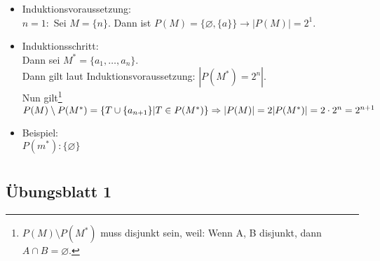 \documentclass[12pt,a4paper]{report}
\begin{document}
\begin{enumerate}
		\begin{itemize}
			\item Induktionsvoraussetzung:\\
			$ n=1: $ Sei $M=\{n\}$. Dann ist $P(M)=\{\varnothing,\{a\}\} \rightarrow |P(M)|=2^1$.
			\item Induktionsschritt:\\
			Dann sei $M^*=\{a_1,\dots, a_n\}$.\\
			Dann gilt laut Induktionsvoraussetzung: $|P(M^*)=2^n|$.
			\\Nun gilt\footnote{$P(M) \setminus P(M^*)$ muss disjunkt sein, weil: Wenn A, B disjunkt, dann $ A \cap B = \varnothing$.} $P(M) \setminus P(M^*) = \{T \cup \{a_{n+1}\} | T \in P(M^*)\} \\
			\Rightarrow |P(M)|=2|P(M^*)|=2\cdot 2^n= 2^{n+1}$
			\item Beispiel:\\
			$ P(m^*):\{\varnothing\}$
		\end{itemize}
	\end{enumerate}

\appendices
	\chapter{}
	\section{Übungsblatt 1}\label{uebungsblatt1}
	
\end{document}
